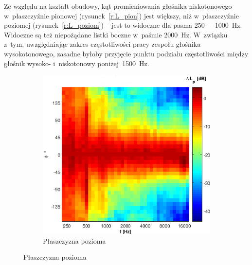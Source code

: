 \documentclass[12pt]{oska}
\newcommand{\range}[2]{\num{#1}~--~\num{#2}}
\begin{document}
	Ze względu na kształt obudowy, kąt promieniowania głośnika niskotonowego w~płaszczyźnie pionowej (rysunek~\ref{r:L_pion}) jest większy, niż w~płaszczyźnie poziomej (rysunek~\ref{r:L_poziom}) -- jest to widoczne dla pasma \range{250}{1000}~\si{\hertz}. Widoczne są też niepożądane listki boczne w~paśmie \SI{2000}{\hertz}. W~związku z~tym, uwzględniając zakres częstotliwości pracy zespołu głośnika wysokotonowego, zasadne byłoby przyjęcie punktu podziału częstotliwości między głośnik wysoko- i~niskotonowy poniżej~\SI{1500}{\hertz}.
	
	\begin{figure}[!ht]
		\centering
		\begin{subfigure}[b]{.7\textwidth}
			\includegraphics[width=\textwidth]{poziom_H.png}
			\caption{Płaszczyzna pozioma}
			\label{r:H_poziom}
		\end{subfigure}
		

\end{figure}
\end{document}
